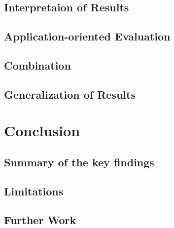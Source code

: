 \documentclass{article}
\begin{document}
\subsection{Interpretaion of Results}
\subsection{Application-oriented Evaluation}
\subsection{Combination}
\subsection{Generalization of Results}

\section{Conclusion}
\subsection{Summary of the key findings}
\subsection{Limitations}
\subsection{Further Work}









\appendix
\end{document}
